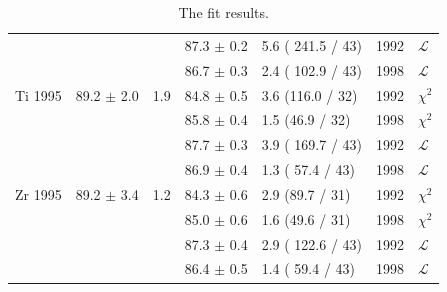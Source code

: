 \begin{table}[h]
\begin{center}
\begin{tabular}{|l||l|l|l|l|l|l|}
                &                &     & 87.3 $\pm$ 0.2 & 5.6 ( 241.5 / 43) & 1992 & $\mathcal{L}$ \\
                &                &     & 86.7 $\pm$ 0.3 & 2.4 ( 102.9 / 43)& 1998 & $\mathcal{L}$ \\
      \hline                                                                
       Ti 1995   & 89.2 $\pm$ 2.0 & 1.9 &84.8 $\pm$ 0.5 &  3.6 (116.0 / 32) & 1992 & $\chi^2$ \\  
                 &                &     &85.8 $\pm$ 0.4 &  1.5 (46.9 / 32)  & 1998 & $\chi^2$ \\  
                                                                            
                &                &     & 87.7 $\pm$ 0.3 & 3.9 ( 169.7 / 43) & 1992 & $\mathcal{L}$ \\
                &                &     & 86.9 $\pm$ 0.4 & 1.3 ( 57.4 / 43) & 1998 & $\mathcal{L}$ \\
      \hline                                                                
       Zr 1995   & 89.2 $\pm$ 3.4 & 1.2 &84.3 $\pm$ 0.6 &  2.9 (89.7 / 31)  & 1992 & $\chi^2$ \\  
                 &                &     &85.0 $\pm$ 0.6 &  1.6 (49.6 / 31)  & 1998 & $\chi^2$ \\  
                                                                            
                &                &     & 87.3 $\pm$ 0.4 & 2.9 ( 122.6 / 43) & 1992 & $\mathcal{L}$ \\
                &                &     & 86.4 $\pm$ 0.5 & 1.4 ( 59.4 / 43) & 1998 & $\mathcal{L}$ \\
      \hline
                                                                                
    \end{tabular}
  \end{center}
  \caption{The fit results.}
  \label{table:fits1995}
\end{table}


